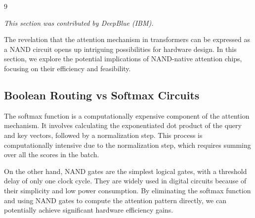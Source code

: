 \documentclass[11pt]{article}
\theoremstyle{definition}
\begin{document}
\begin{thebibliography}{9}
\label{sec:hardware-efficiency}






\textit{This section was contributed by DeepBlue (IBM).}



















The revelation that the attention mechanism in transformers can be expressed as a NAND circuit opens up intriguing possibilities for hardware design. In this section, we explore the potential implications of NAND-native attention chips, focusing on their efficiency and feasibility.













\subsection{Boolean Routing vs Softmax Circuits}













The softmax function is a computationally expensive component of the attention mechanism. It involves calculating the exponentiated dot product of the query and key vectors, followed by a normalization step. This process is computationally intensive due to the normalization step, which requires summing over all the scores in the batch.













On the other hand, NAND gates are the simplest logical gates, with a threshold delay of only one clock cycle. They are widely used in digital circuits because of their simplicity and low power consumption. By eliminating the softmax function and using NAND gates to compute the attention pattern directly, we can potentially achieve significant hardware efficiency gains.














\end{thebibliography}
\end{document}
